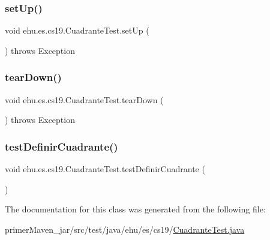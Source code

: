 \subsubsection{\texorpdfstring{setUp()}{setUp()}}
{\footnotesize\ttfamily void ehu.\+es.\+cs19.\+Cuadrante\+Test.\+set\+Up (\begin{DoxyParamCaption}{ }\end{DoxyParamCaption}) throws Exception\hspace{0.3cm}{\ttfamily [protected]}}

\mbox{\label{classehu_1_1es_1_1cs19_1_1_cuadrante_test_afea9541f98f4033d93cfed1eefd4d6a8}} 
\subsubsection{\texorpdfstring{tearDown()}{tearDown()}}
{\footnotesize\ttfamily void ehu.\+es.\+cs19.\+Cuadrante\+Test.\+tear\+Down (\begin{DoxyParamCaption}{ }\end{DoxyParamCaption}) throws Exception\hspace{0.3cm}{\ttfamily [protected]}}

\mbox{\label{classehu_1_1es_1_1cs19_1_1_cuadrante_test_a6ca722f12b7c56a795ce28675ad55379}} 
\subsubsection{\texorpdfstring{testDefinirCuadrante()}{testDefinirCuadrante()}}
{\footnotesize\ttfamily void ehu.\+es.\+cs19.\+Cuadrante\+Test.\+test\+Definir\+Cuadrante (\begin{DoxyParamCaption}{ }\end{DoxyParamCaption})}



The documentation for this class was generated from the following file\+:\begin{DoxyCompactItemize}
\item 
primer\+Maven\+\_\+jar/src/test/java/ehu/es/cs19/\mbox{\hyperlink{_cuadrante_test_8java}{Cuadrante\+Test.\+java}}\end{DoxyCompactItemize}
